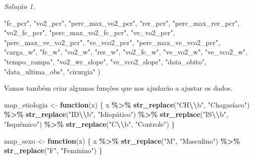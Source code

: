 \documentclass[
]{latex/krantz}
\newenvironment{Shaded}{\begin{snugshade}}{\end{snugshade}}
\newcommand{\ControlFlowTok}[1]{\textcolor[rgb]{0.13,0.29,0.53}{\textbf{#1}}}
\newcommand{\FunctionTok}[1]{\textcolor[rgb]{0.13,0.29,0.53}{\textbf{#1}}}
\newcommand{\NormalTok}[1]{#1}
\newcommand{\OtherTok}[1]{\textcolor[rgb]{0.56,0.35,0.01}{#1}}
\newcommand{\SpecialCharTok}[1]{\textcolor[rgb]{0.81,0.36,0.00}{\textbf{#1}}}
\newcommand{\StringTok}[1]{\textcolor[rgb]{0.31,0.60,0.02}{#1}}
\theoremstyle{definition}
\theoremstyle{definition}
\theoremstyle{definition}
\theoremstyle{definition}
\theoremstyle{remark}
\newtheorem*{solution}{Solução}
\begin{document}
\begin{solution}
\begin{Shaded}
\begin{Highlighting}[]
                        \StringTok{"fc\_pcr"}\NormalTok{, }\StringTok{"vo2\_pcr"}\NormalTok{, }\StringTok{"perc\_max\_vo2\_pcr"}\NormalTok{, }\StringTok{"rer\_pcr"}\NormalTok{, }\StringTok{"perc\_max\_rer\_pcr"}\NormalTok{,}
                        \StringTok{"vo2\_fc\_pcr"}\NormalTok{, }\StringTok{"perc\_max\_vo2\_fc\_pcr"}\NormalTok{, }\StringTok{"ve\_vo2\_pcr"}\NormalTok{, }\StringTok{"perc\_max\_ve\_vo2\_pcr"}\NormalTok{,}
                        \StringTok{"ve\_vco2\_pcr"}\NormalTok{, }\StringTok{"perc\_max\_ve\_vco2\_pcr"}\NormalTok{, }\StringTok{"carga\_w"}\NormalTok{, }\StringTok{"fc\_w"}\NormalTok{,}
                        \StringTok{"vo2\_w"}\NormalTok{, }\StringTok{"rer\_w"}\NormalTok{, }\StringTok{"vo2\_fc\_w"}\NormalTok{, }\StringTok{"ve\_vo2\_w"}\NormalTok{, }\StringTok{"ve\_vco2\_w"}\NormalTok{,}
                        \StringTok{"tempo\_rampa"}\NormalTok{, }\StringTok{"vo2\_wr\_slope"}\NormalTok{, }\StringTok{"ve\_vco2\_slope"}\NormalTok{, }\StringTok{"data\_obito"}\NormalTok{, }
                        \StringTok{"data\_ultima\_obs"}\NormalTok{, }\StringTok{"cirurgia"}
\NormalTok{                      )}
\end{Highlighting}
\end{Shaded}

Vamos também criar algumas funções que nos ajudarão a ajustar os dados.

\begin{Shaded}
\begin{Highlighting}[]
\NormalTok{map\_etiologia }\OtherTok{\textless{}{-}} \ControlFlowTok{function}\NormalTok{(x) \{}
\NormalTok{  x }\SpecialCharTok{\%\textgreater{}\%} 
    \FunctionTok{str\_replace}\NormalTok{(}\StringTok{"CH}\SpecialCharTok{\textbackslash{}\textbackslash{}}\StringTok{b"}\NormalTok{, }\StringTok{"Chagasíaco"}\NormalTok{) }\SpecialCharTok{\%\textgreater{}\%}
    \FunctionTok{str\_replace}\NormalTok{(}\StringTok{"ID}\SpecialCharTok{\textbackslash{}\textbackslash{}}\StringTok{b"}\NormalTok{, }\StringTok{"Idiopático"}\NormalTok{) }\SpecialCharTok{\%\textgreater{}\%}
    \FunctionTok{str\_replace}\NormalTok{(}\StringTok{"IS}\SpecialCharTok{\textbackslash{}\textbackslash{}}\StringTok{b"}\NormalTok{, }\StringTok{"Isquêmico"}\NormalTok{) }\SpecialCharTok{\%\textgreater{}\%}
    \FunctionTok{str\_replace}\NormalTok{(}\StringTok{"C}\SpecialCharTok{\textbackslash{}\textbackslash{}}\StringTok{b"}\NormalTok{, }\StringTok{"Controle"}\NormalTok{)}
\NormalTok{\}}

\NormalTok{map\_sexo }\OtherTok{\textless{}{-}} \ControlFlowTok{function}\NormalTok{(x) \{}
\NormalTok{  x }\SpecialCharTok{\%\textgreater{}\%}
    \FunctionTok{str\_replace}\NormalTok{(}\StringTok{"M"}\NormalTok{, }\StringTok{"Masculino"}\NormalTok{) }\SpecialCharTok{\%\textgreater{}\%}
    \FunctionTok{str\_replace}\NormalTok{(}\StringTok{"F"}\NormalTok{, }\StringTok{"Feminino"}\NormalTok{)}
\NormalTok{\}}


\end{Highlighting}
\end{Shaded}
\end{solution}
\end{document}
